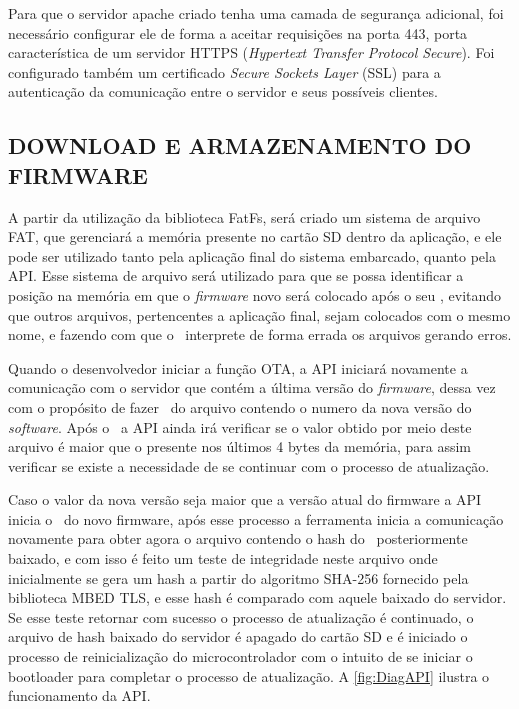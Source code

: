 Para que o servidor apache criado tenha uma camada de segurança adicional, foi necessário configurar ele de forma a aceitar requisições na porta 443, porta característica de um servidor HTTPS (\textit{Hypertext Transfer Protocol Secure}). Foi configurado também um certificado \textit{Secure Sockets Layer} (SSL) para a autenticação da comunicação entre o servidor e seus possíveis clientes.


\subsection{DOWNLOAD E ARMAZENAMENTO DO FIRMWARE}

A partir da utilização da biblioteca FatFs, será criado um sistema de arquivo FAT, que gerenciará a memória presente no cartão SD dentro da aplicação, e ele pode ser utilizado tanto pela aplicação final do sistema embarcado, quanto pela API. Esse sistema de arquivo será utilizado para que se possa identificar a posição na memória em que o \textit{firmware} novo será colocado após o seu \download, evitando que outros arquivos, pertencentes a aplicação final, sejam colocados com o mesmo nome, e fazendo com que o \bootloader\ interprete de forma errada os arquivos gerando erros.

Quando o desenvolvedor iniciar a função OTA, a API iniciará novamente a comunicação com o servidor que contém a última versão do \textit{firmware}, dessa vez com o propósito de fazer \download\ do arquivo contendo o numero da nova versão do \textit{software}. Após o \download\ a API ainda irá verificar se o valor obtido por meio deste arquivo é maior que o presente nos últimos 4 bytes da memória, para assim verificar se existe a necessidade de se continuar com o processo de atualização. 

Caso o valor da nova versão seja maior que a versão atual do firmware a API inicia o \download\ do novo firmware, após esse processo a ferramenta inicia a comunicação novamente para obter agora o arquivo contendo o hash do \firmware\ posteriormente baixado, e com isso é feito um teste de integridade neste arquivo onde inicialmente se gera um hash a partir do algoritmo SHA-256 fornecido pela biblioteca MBED TLS, e esse hash é comparado com aquele baixado do servidor. Se esse teste retornar com sucesso o processo de atualização é continuado, o arquivo de hash baixado do servidor é apagado do cartão SD e é iniciado o processo de reinicialização do microcontrolador com o intuito de se iniciar o bootloader para completar o processo de atualização.
A \autoref{fig:DiagAPI} ilustra o funcionamento da API.

